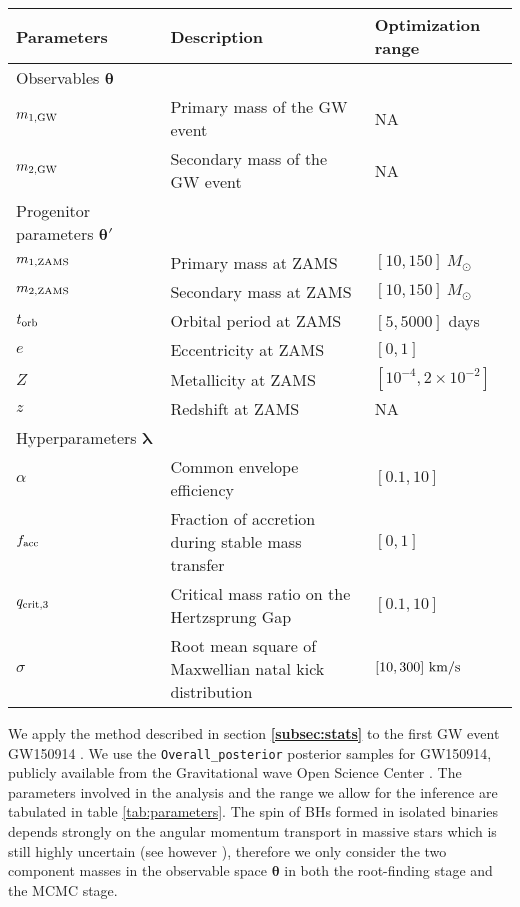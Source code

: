 \documentclass[linenumbers,twocolumn]{aastex631}
\begin{document}
\begin{table*}[hbt!]
    \begin{center}
    \begin{tabular}{ l l l }
    \hline
    \hline
    Parameters &  Description & Optimization range\\
    \hline
    \hline
    Observables $\bm{\theta}$ &\ &\  \\
    \hline
    \hline
    $m_{\rm 1, GW}$ & Primary mass of the GW event & NA \\
    $m_{\rm 2, GW}$ & Secondary mass of the GW event  & NA\\
    \hline
    \hline
    Progenitor parameters $\bm{\theta'}$&\ &\  \\
    \hline
    \hline
    $m_{\rm 1, ZAMS}$ & Primary mass at ZAMS & $[10,150]\ M_{\odot}$\\
    $m_{\rm 2, ZAMS}$ & Secondary mass at ZAMS & $[10,150]\ M_{\odot}$\\
    $t_{\rm orb}$ & Orbital period at ZAMS & $[5,5000]$ days\\
    $e$ & Eccentricity at ZAMS & $[0,1]$\\
    $Z$ & Metallicity at ZAMS & $[10^{-4},2\times10^{-2}]$\\
    $z$ & Redshift at ZAMS & NA\\
    \hline
    \hline
    Hyperparameters $\bm{\lambda    }$ &\ &\ \\
    \hline
    \hline

    $\alpha$ & Common envelope efficiency & $[0.1,10]$\\
    $f_{\rm acc}$ & Fraction of accretion during stable mass transfer &
    $[0,1]$\\
    $q_{\rm crit,3}$ & Critical mass ratio on the Hertzsprung Gap & $[0.1,10]$\\
    $\sigma$ & Root mean square of Maxwellian natal kick distribution&
    $[10,300]\ {\rm km/s}$\\


    \hline
    \hline
    \end{tabular}
    \caption{A list of parameters used in this study.}
    \label{tab:parameters}
    \end{center}
\end{table*}

We apply the method described in section \textbf{\ref{subsec:stats}} to the first GW event GW150914 \citep{GW150914}.
We use the \texttt{Overall\_posterior} posterior samples for GW150914,
publicly available from the Gravitational wave Open Science Center \citep{LIGOScientific:2019lzm}. 
The parameters involved in the analysis and the range we allow for the inference are tabulated in table \ref{tab:parameters}.
The spin of BHs formed in isolated binaries depends strongly on the angular
momentum transport in massive stars which is still highly uncertain (see however \citet{Fuller2019, Bavera2020}),
therefore we only consider the two component masses in the observable space $\bm{\theta}$ in both the
root-finding stage and the MCMC stage. 
\end{document}
